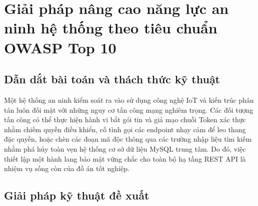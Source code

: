 ﻿\documentclass[../DoAn.tex]{subfiles}
\begin{document}
\section{Giải pháp nâng cao năng lực an ninh hệ thống theo tiêu chuẩn OWASP Top 10}
\label{section:5.3}

\subsection{Dẫn dắt bài toán và thách thức kỹ thuật}

Một hệ thống an ninh kiểm soát ra vào sử dụng công nghệ IoT và kiến trúc phân tán luôn đối mặt với những nguy cơ tấn công mạng nghiêm trọng. Các đối tượng tấn công có thể thực hiện hành vi bắt gói tin và giả mạo chuỗi Token xác thực nhằm chiếm quyền điều khiển, cố tình gọi các endpoint nhạy cảm để leo thang đặc quyền, hoặc chèn các đoạn mã độc thông qua các trường nhập liệu tìm kiếm nhằm phá hủy toàn vẹn hệ thống cơ sở dữ liệu MySQL trung tâm. Do đó, việc thiết lập một hành lang bảo mật vững chắc cho toàn bộ hạ tầng REST API là nhiệm vụ sống còn của đồ án tốt nghiệp.

\subsection{Giải pháp kỹ thuật đề xuất}
\end{document}
